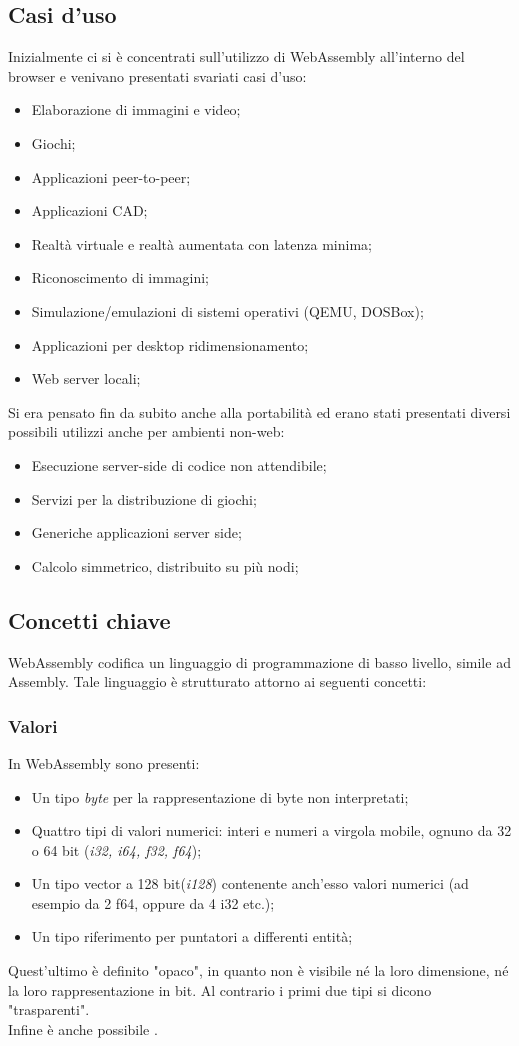 \subsection{Casi d'uso}
Inizialmente ci si è concentrati sull'utilizzo di WebAssembly all'interno del browser e venivano presentati svariati casi d'uso:
\begin{itemize}
        \item Elaborazione di immagini e video;
        \item Giochi;
        \item Applicazioni peer-to-peer;
        \item Applicazioni CAD;
        \item Realtà virtuale e realtà aumentata con latenza minima;
        \item Riconoscimento di immagini;
        \item Simulazione/emulazioni di sistemi operativi (QEMU, DOSBox);
        \item Applicazioni per desktop ridimensionamento;
        \item Web server locali;
\end{itemize}
Si era pensato fin da subito anche alla portabilità ed erano stati presentati diversi possibili utilizzi anche per ambienti non-web:
\begin{itemize}
        \item Esecuzione server-side di codice non attendibile;
        \item Servizi per la distribuzione di giochi;
        \item Generiche applicazioni server side;
        \item Calcolo simmetrico, distribuito su più nodi;
\end{itemize}
\subsection{Concetti chiave}
WebAssembly codifica un linguaggio di programmazione di basso livello, simile ad Assembly. Tale linguaggio è strutturato attorno ai seguenti concetti:\cite*{wasmSpec}

\subsubsection{Valori}
In WebAssembly sono presenti:
\begin{itemize}
        \item Un tipo \emph{byte} per la rappresentazione di byte non interpretati;
        \item Quattro tipi di valori numerici: interi e numeri a virgola mobile, ognuno da 32 o 64 bit (\emph{i32, i64, f32, f64});
        \item Un tipo vector a 128 bit(\emph{i128}) contenente anch'esso valori numerici (ad esempio da 2 f64, oppure da 4 i32 etc.);
        \item Un tipo riferimento per puntatori a differenti entità;
\end{itemize}
Quest'ultimo è definito "opaco", in quanto non è visibile né la loro dimensione, né la loro rappresentazione in bit. Al contrario i primi due tipi si dicono "trasparenti".
\\Infine è anche possibile .
